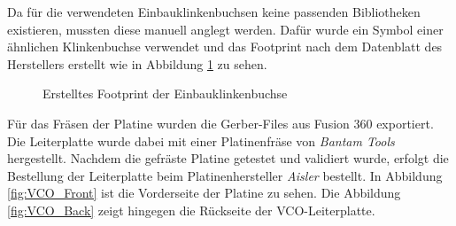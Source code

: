 Da für die verwendeten Einbauklinkenbuchsen keine passenden Bibliotheken existieren, mussten diese manuell anglegt werden.
Dafür wurde ein Symbol einer ähnlichen Klinkenbuchse verwendet und das Footprint nach dem Datenblatt des Herstellers erstellt wie in Abbildung \ref{fig:Klinkenbuchse Footprint} zu sehen.

\begin{figure}[h]
	\centering
	\setlength{\fboxsep}{1pt} %
	\setlength{\fboxrule}{1pt} %
	\caption{Erstelltes Footprint der Einbauklinkenbuchse}
	\label{fig:Klinkenbuchse Footprint}
\end{figure}


Für das Fräsen der Platine wurden die Gerber-Files aus Fusion 360 exportiert.
Die Leiterplatte wurde dabei mit einer Platinenfräse von \textit{Bantam Tools} hergestellt.
Nachdem die gefräste Platine getestet und validiert wurde, erfolgt die Bestellung der Leiterplatte beim Platinenhersteller \textit{Aisler} bestellt. 
In Abbildung \ref{fig:VCO_Front} ist die Vorderseite der Platine zu sehen.
Die Abbildung \ref{fig:VCO_Back} zeigt hingegen die Rückseite der VCO-Leiterplatte. 

